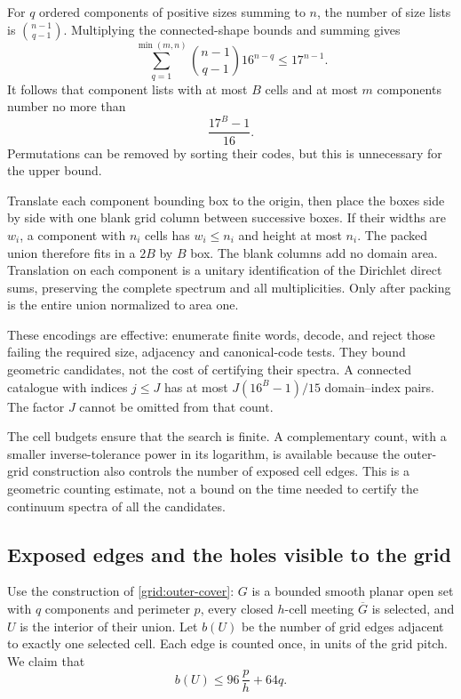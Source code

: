 \documentclass[11pt,reqno]{amsart}
\numberwithin{equation}{section}
\begin{document}
For $q$ ordered components of positive sizes summing to $n$, the
number of size lists is $\binom{n-1}{q-1}$. Multiplying the
connected-shape bounds and summing gives
\[
 \sum_{q=1}^{\min(m,n)}\binom{n-1}{q-1}16^{n-q}
 \le17^{n-1}.
\]
It follows that component lists with at most $B$ cells and at most
$m$ components number no more than
\begin{equation}\label{enc:count}
 \frac{17^B-1}{16}.
\end{equation}
Permutations can be removed by sorting their codes, but this is
unnecessary for the upper bound.

Translate each component bounding box to the origin, then place
the boxes side by side with one blank grid column between
successive boxes. If their widths are $w_i$, a component with
$n_i$ cells has $w_i\le n_i$ and height at most $n_i$.
The packed union therefore fits in a $2B$ by $B$ box.
The blank columns add no domain area. Translation on each
component is a unitary identification of the Dirichlet direct sums,
preserving the complete spectrum and all multiplicities. Only
after packing is the entire union normalized to area one.

These encodings are effective: enumerate finite words, decode,
and reject those failing the required size, adjacency and
canonical-code tests. They bound geometric candidates, not the
cost of certifying their spectra. A connected catalogue with
indices $j\le J$ has at most $J(16^B-1)/15$ domain--index pairs.
The factor $J$ cannot be omitted from that count.

The cell budgets ensure that the search is finite.  A complementary
count, with a smaller inverse-tolerance power in its logarithm, is
available because the outer-grid construction also controls the
number of exposed cell edges.  This is a geometric counting
estimate, not a bound on the time needed to certify the continuum
spectra of all the candidates.

\subsection{Exposed edges and the holes visible to the grid}
\label{boundary:exposed-section}

Use the construction of \eqref{grid:outer-cover}: \(G\) is a bounded
smooth planar open set with \(q\) components and perimeter \(p\),
every closed \(h\)-cell meeting \(\overline G\) is selected, and
\(U\) is the interior of their union.  Let \(b(U)\) be the number of
grid edges adjacent to exactly one selected cell.  Each edge is
counted once, in units of the grid pitch.  We claim that
\begin{equation}
 b(U)\le96\,\frac ph+64q.
 \label{boundary:edge-count}
\end{equation}
\end{document}
